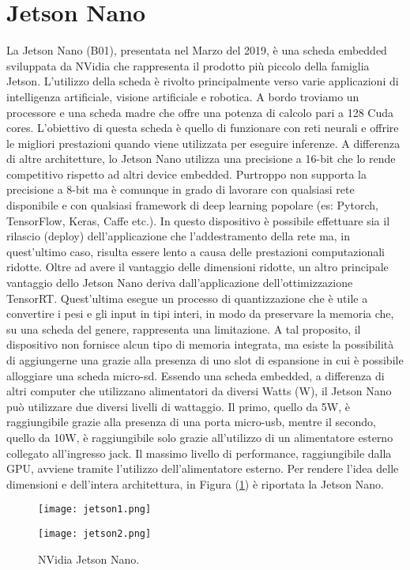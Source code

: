 \section{Jetson Nano}
La Jetson Nano (B01), presentata nel Marzo del 2019,  è una scheda embedded 
sviluppata da NVidia che rappresenta il prodotto più piccolo della 
famiglia Jetson. L'utilizzo della scheda è rivolto principalmente verso varie 
applicazioni di intelligenza artificiale, visione artificiale e robotica. A bordo 
troviamo un processore e una scheda madre che offre una potenza di calcolo 
pari a 128 Cuda cores. L'obiettivo di questa scheda è quello di funzionare 
con reti neurali e offrire le migliori prestazioni quando viene utilizzata per 
eseguire inferenze. A differenza di altre architetture, lo Jetson Nano utilizza 
una precisione a 16-bit che lo rende competitivo rispetto ad altri device 
embedded. Purtroppo non supporta la precisione a 8-bit ma è comunque in 
grado di lavorare con qualsiasi rete disponibile e con qualsiasi framework di 
deep learning popolare (es: Pytorch, TensorFlow, Keras, Caffe etc.). In questo 
dispositivo è possibile effettuare sia il rilascio (deploy) dell'applicazione 
che l'addestramento della rete ma, in quest'ultimo caso, risulta essere lento 
a causa delle prestazioni computazionali ridotte. Oltre ad avere il vantaggio 
delle dimensioni ridotte, un altro principale vantaggio dello Jetson Nano 
deriva dall'applicazione dell'ottimizzazione TensorRT. Quest'ultima esegue 
un processo di quantizzazione che è utile a convertire i pesi e gli input in 
tipi interi, in modo da preservare la memoria che, su una scheda del genere, 
rappresenta una limitazione. A tal proposito, il dispositivo non fornisce 
alcun tipo di memoria integrata, ma esiste la possibilità di aggiungerne una 
grazie alla presenza di uno slot di espansione in cui è possibile alloggiare 
una scheda micro-sd. Essendo una scheda embedded, a differenza di altri 
computer che utilizzano alimentatori da diversi Watts (W), il Jetson Nano 
può utilizzare due diversi livelli di wattaggio. Il primo, quello da 5W, è 
raggiungibile grazie alla presenza di una porta micro-usb, mentre il secondo, 
quello da 10W, è raggiungibile solo grazie all'utilizzo di un alimentatore 
esterno collegato all'ingresso jack. Il massimo livello di performance, raggiungibile 
dalla GPU, avviene tramite l'utilizzo dell'alimentatore esterno. 
Per rendere l'idea delle dimensioni e dell'intera architettura, in Figura (\ref{jetson}) 
è riportata la Jetson Nano.
\begin{figure}[]
    \begin{minipage}[t]{.45\textwidth}
        \centering
        \texttt{[image: jetson1.png]}
    \end{minipage}
    \hfill
    \begin{minipage}[t]{.45\textwidth}
        \centering
        \texttt{[image: jetson2.png]}
    \end{minipage}  
    \caption{NVidia Jetson Nano.}
    \label{jetson}
\end{figure}

